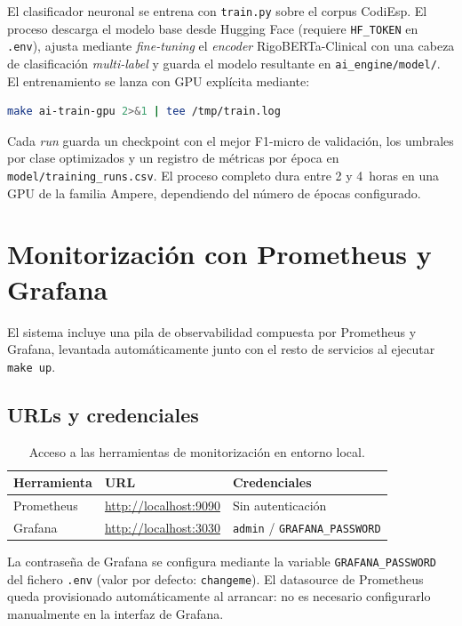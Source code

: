 El clasificador neuronal se entrena con \texttt{train.py} sobre el corpus CodiEsp. El proceso descarga el modelo base desde Hugging Face (requiere \texttt{HF\_TOKEN} en \texttt{.env}), ajusta mediante \emph{fine-tuning} el \emph{encoder} RigoBERTa-Clinical con una cabeza de clasificación \emph{multi-label} y guarda el modelo resultante en \texttt{ai\_engine/model/}. El entrenamiento se lanza con GPU explícita mediante:

\begin{lstlisting}[language=bash]
make ai-train-gpu 2>&1 | tee /tmp/train.log
\end{lstlisting}

Cada \emph{run} guarda un checkpoint con el mejor F1-micro de validación, los umbrales por clase optimizados y un registro de métricas por época en \texttt{model/training\_runs.csv}. El proceso completo dura entre 2 y 4~horas en una GPU de la familia Ampere, dependiendo del número de épocas configurado.

\section{Monitorización con Prometheus y Grafana}

El sistema incluye una pila de observabilidad compuesta por Prometheus y Grafana, levantada automáticamente junto con el resto de servicios al ejecutar \texttt{make up}.

\subsection{URLs y credenciales}

\begin{table}[h]
\centering
\caption{Acceso a las herramientas de monitorización en entorno local.}
\label{tab:monitoring-urls}
\begin{tabular}{lll}
\hline
\textbf{Herramienta} & \textbf{URL} & \textbf{Credenciales} \\
\hline
Prometheus & \url{http://localhost:9090} & Sin autenticación \\
Grafana & \url{http://localhost:3030} & \texttt{admin} / \texttt{GRAFANA\_PASSWORD} \\
\hline
\end{tabular}
\end{table}

La contraseña de Grafana se configura mediante la variable \texttt{GRAFANA\_PASSWORD} del fichero \texttt{.env} (valor por defecto: \texttt{changeme}). El datasource de Prometheus queda provisionado automáticamente al arrancar: no es necesario configurarlo manualmente en la interfaz de Grafana.

